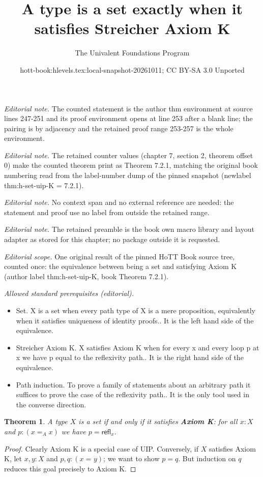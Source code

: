 \documentclass[10pt,a4paper]{article}
\title{A type is a set exactly when it satisfies Streicher Axiom K}
\author{The Univalent Foundations Program}
\date{hott-book:hlevels.tex:local-snapshot-20261011; CC BY-SA 3.0 Unported}
\newcounter{chapter}
\providecommand{\index}[1]{}
\newcommand{\define}[1]{\textbf{#1}}
\newcommand{\id}[3][]{\ensuremath{#2 =_{#1} #3}\xspace}
\newcommand{\refl}[1]{\ensuremath{\mathsf{refl}_{#1}}\xspace}
\newtheorem{thm}{Theorem}[section]
\theoremstyle{definition}
\theoremstyle{remark}
\numberwithin{equation}{section}
\newcommand{\indexdef}[1]{\index{#1|defstyle}}   %
\begin{document}
\maketitle
\setcounter{chapter}{7}
\setcounter{section}{2}
\setcounter{thm}{0}
\noindent\textit{Editorial note.} The counted statement is the author thm environment at source lines 247-251 and its proof environment opens at line 253 after a blank line; the pairing is by adjacency and the retained proof range 253-257 is the whole environment.\par\medskip
\noindent\textit{Editorial note.} The retained counter values (chapter 7, section 2, theorem offset 0) make the counted theorem print as Theorem 7.2.1, matching the original book numbering read from the label-number dump of the pinned snapshot (newlabel thm:h-set-uip-K = 7.2.1).\par\medskip
\noindent\textit{Editorial note.} No context span and no external reference are needed: the statement and proof use no label from outside the retained range.\par\medskip
\noindent\textit{Editorial note.} The retained preamble is the book own macro library and layout adapter as stored for this chapter; no package outside it is requested.\par\medskip
\noindent\textit{Editorial scope.} One original result of the pinned HoTT Book source tree, counted once: the equivalence between being a set and satisfying Axiom K (author label thm:h-set-uip-K, book Theorem 7.2.1).\par\medskip
\noindent\textit{Allowed standard prerequisites (editorial).}\begin{itemize}
\item Set. X is a set when every path type of X is a mere proposition, equivalently when it satisfies uniqueness of identity proofs.. It is the left hand side of the equivalence.
\item Streicher Axiom K. X satisfies Axiom K when for every x and every loop p at x we have p equal to the reflexivity path.. It is the right hand side of the equivalence.
\item Path induction. To prove a family of statements about an arbitrary path it suffices to prove the case of the reflexivity path.. It is the only tool used in the converse direction.
\end{itemize}\medskip
\begin{thm}\label{thm:h-set-uip-K}
 A type $X$ is a set if and only if it satisfies \define{Axiom K}:
 \indexdef{axiom!Streicher's Axiom K}%
 for all $x : X$ and $p : (x =_A x)$ we have $p = \refl{x}$.
\end{thm}

\begin{proof}
  Clearly Axiom K is a special case of UIP.
  Conversely, if $X$ satisfies Axiom K, let $x, y : X$ and $p, q : (\id{x}{y})$; we want to show $p=q$.
  But induction on $q$ reduces this goal precisely to Axiom K.
\end{proof}
\end{document}
